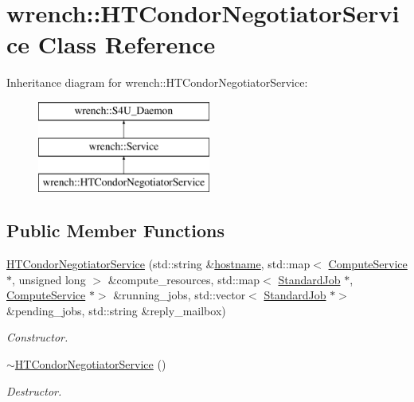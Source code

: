 \hypertarget{classwrench_1_1_h_t_condor_negotiator_service}{}\section{wrench\+:\+:H\+T\+Condor\+Negotiator\+Service Class Reference}
\label{classwrench_1_1_h_t_condor_negotiator_service}
Inheritance diagram for wrench\+:\+:H\+T\+Condor\+Negotiator\+Service\+:\begin{figure}[H]
\begin{center}
\leavevmode
\includegraphics[height=3.000000cm]{classwrench_1_1_h_t_condor_negotiator_service}
\end{center}
\end{figure}
\subsection*{Public Member Functions}
\begin{DoxyCompactItemize}
\item 
\hyperlink{classwrench_1_1_h_t_condor_negotiator_service_a26a062744cd9445e3d77a984d794e53e}{H\+T\+Condor\+Negotiator\+Service} (std\+::string \&\hyperlink{classwrench_1_1_s4_u___daemon_a52bc0b9a6cd248310749dac086819f00}{hostname}, std\+::map$<$ \hyperlink{classwrench_1_1_compute_service}{Compute\+Service} $\ast$, unsigned long $>$ \&compute\+\_\+resources, std\+::map$<$ \hyperlink{classwrench_1_1_standard_job}{Standard\+Job} $\ast$, \hyperlink{classwrench_1_1_compute_service}{Compute\+Service} $\ast$$>$ \&running\+\_\+jobs, std\+::vector$<$ \hyperlink{classwrench_1_1_standard_job}{Standard\+Job} $\ast$$>$ \&pending\+\_\+jobs, std\+::string \&reply\+\_\+mailbox)
\begin{DoxyCompactList}\small\item\em Constructor. \end{DoxyCompactList}\item 
\mbox{\label{classwrench_1_1_h_t_condor_negotiator_service_abbf969719d1b43ccfce10e7546eecea0}} 
\hyperlink{classwrench_1_1_h_t_condor_negotiator_service_abbf969719d1b43ccfce10e7546eecea0}{$\sim$\+H\+T\+Condor\+Negotiator\+Service} ()
\begin{DoxyCompactList}\small\item\em Destructor. \end{DoxyCompactList}\end{DoxyCompactItemize}
